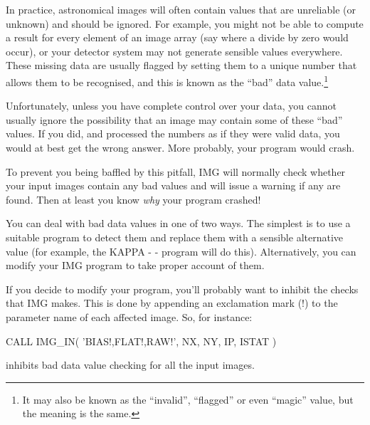 \documentclass[twoside,11pt,nolof]{starlink}
\newenvironment{code}{\begin{small}}
                     {\end{small}}
\begin{document}
In practice, astronomical images will often contain values that are
unreliable (or unknown) and should be ignored. For example, you might
not be able to compute a result for every element of an image array
(say where a divide by zero would occur), or your detector system may
not generate sensible values everywhere.  These missing data are
usually flagged by setting them to a unique number that allows them to
be recognised, and this is known as the ``bad'' data
value.\footnote{It may also be known as the ``invalid'', ``flagged''
or even ``magic'' value, but the meaning is the same.}

Unfortunately, unless you have complete control over your data, you
cannot usually ignore the possibility that an image may contain some
of these ``bad'' values.  If you did, and processed the numbers as if
they were valid data, you would at best get the wrong answer. More
probably, your program would crash.

To prevent you being baffled by this pitfall, IMG will normally check
whether your input images contain any bad values and will issue a
warning if any are found. Then at least you know \emph{why} your
program crashed!

You can deal with bad data values in one of two ways. The simplest is
to use a suitable program to detect them and replace them with a
sensible alternative value (for example, the KAPPA -
 - program  will
do this). Alternatively, you can modify your IMG program to take
proper account of them.

If you decide to modify your program, you'll probably want to inhibit
the checks that IMG makes. This is done by appending an exclamation
mark (!) to the parameter name of each affected image. So, for
instance:
\begin{code}
\begin{terminalv}
      CALL IMG_IN( 'BIAS!,FLAT!,RAW!', NX, NY, IP, ISTAT )
\end{terminalv}
\end{code}
inhibits bad data value checking for all the input images.
\end{document}
